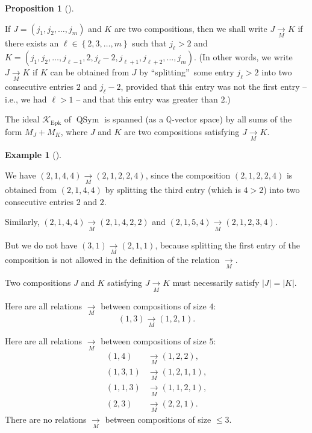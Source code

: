 \documentclass[numbers=enddot,12pt,final,onecolumn,notitlepage]{scrartcl}%
\theoremstyle{definition}
\newtheorem{prop}[theo]{Proposition}
\newenvironment{proposition}[1][]
{\begin{prop}[#1]\begin{leftbar}}
{\end{leftbar}\end{prop}}
\newtheorem{exmp}[theo]{Example}
\newenvironment{example}[1][]
{\begin{exmp}[#1]\begin{leftbar}}
{\end{leftbar}\end{exmp}}
\begin{document}
\begin{proposition}
\label{prop.K.Epk.M}If $J=\left(  j_{1},j_{2},\ldots,j_{m}\right)  $ and $K$
are two compositions, then we shall write $J\underset{M}{\rightarrow}K$ if
there exists an $\ell\in\left\{  2,3,\ldots,m\right\}  $ such that $j_{\ell
}>2$ and $K=\left(  j_{1},j_{2},\ldots,j_{\ell-1},2,j_{\ell}-2,j_{\ell
+1},j_{\ell+2},\ldots,j_{m}\right)  $. (In other words, we write
$J\underset{M}{\rightarrow}K$ if $K$ can be obtained from $J$ by
\textquotedblleft splitting\textquotedblright\ some entry $j_{\ell}>2$ into
two consecutive entries $2$ and $j_{\ell}-2$, provided that this entry was not
the first entry -- i.e., we had $\ell>1$ -- and that this entry was greater
than $2$.)

The ideal $\mathcal{K}_{\operatorname{Epk}}$ of $\operatorname*{QSym}$ is
spanned (as a $\mathbb{Q}$-vector space) by all sums of the form $M_{J}+M_{K}%
$, where $J$ and $K$ are two compositions satisfying
$J\underset{M}{\rightarrow}K$.
\end{proposition}

\begin{example}
We have $\left(  2,1,4,4\right)  \underset{M}{\rightarrow}\left(
2,1,2,2,4\right)  $, since the composition $\left(  2,1,2,2,4\right)  $ is
obtained from $\left(  2,1,4,4\right)  $ by splitting the third entry (which
is $4>2$) into two consecutive entries $2$ and $2$.

Similarly, $\left(  2,1,4,4\right)  \underset{M}{\rightarrow}\left(
2,1,4,2,2\right)  $ and $\left(  2,1,5,4\right)  \underset{M}{\rightarrow
}\left(  2,1,2,3,4\right)  $.

But we do not have $\left(  3,1\right)  \underset{M}{\rightarrow}\left(
2,1,1\right)  $, because splitting the first entry of the composition is not
allowed in the definition of the relation $\underset{M}{\rightarrow}$.

Two compositions $J$ and $K$ satisfying $J\underset{M}{\rightarrow}K$ must
necessarily satisfy $\left\vert J\right\vert =\left\vert K\right\vert $.

Here are all relations $\underset{M}{\rightarrow}$ between compositions of
size $4$:%
\[
\left(  1,3\right)  \underset{M}{\rightarrow}\left(  1,2,1\right)  .
\]


Here are all relations $\underset{M}{\rightarrow}$ between compositions of
size $5$:%
\begin{align*}
\left(  1,4\right)   &  \underset{M}{\rightarrow}\left(  1,2,2\right)  ,\\
\left(  1,3,1\right)   &  \underset{M}{\rightarrow}\left(  1,2,1,1\right)  ,\\
\left(  1,1,3\right)   &  \underset{M}{\rightarrow}\left(  1,1,2,1\right)  ,\\
\left(  2,3\right)   &  \underset{M}{\rightarrow}\left(  2,2,1\right)  .
\end{align*}
There are no relations $\underset{M}{\rightarrow}$ between compositions of
size $\leq3$.
\end{example}
\end{document}
